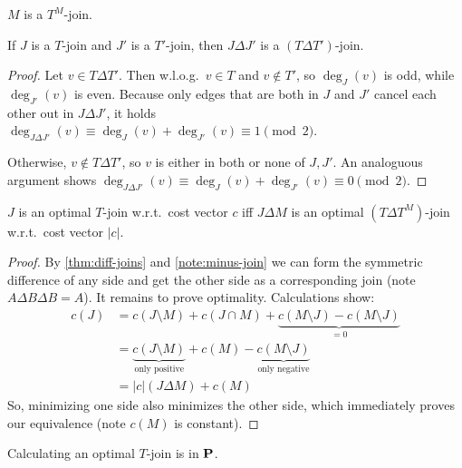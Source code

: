 \begin{remark} \label{note:minus-join}
    $M$ is a $T^M$-join.
\end{remark}
\begin{lemma} \label{thm:diff-joins}
    If $J$ is a $T$-join and $J'$ is a $T'$-join, then $J \Delta J'$ is a $(T \Delta T')$-join.
\end{lemma}
\begin{proof}
    Let $v \in T \Delta T'$. Then w.l.o.g.\ $v \in T$ and $v \not \in T'$,
    so $\deg_{J}(v)$ is odd, while $\deg_{J'}(v)$ is even. Because only edges that are both in $J$ and $J'$
    cancel each other out in $J \Delta J'$, it holds $\deg_{J\Delta J'}(v) \equiv \deg_{J}(v) + \deg_{J'}(v) \equiv 1 \pmod{2}$.

    Otherwise, $v \not \in T \Delta T'$, so $v$ is either in both or none of $J, J'$.
    An analoguous argument shows $\deg_{J\Delta J'}(v) \equiv \deg_{J}(v) + \deg_{J'}(v) \equiv 0 \pmod{2}$.
\end{proof}
\begin{theorem}
    $J$ is an optimal $T$-join w.r.t.\ cost vector $c$
    iff $J \Delta M$ is an optimal $(T \Delta T^M)$-join w.r.t.\ cost vector $|c|$.
\end{theorem}
\begin{proof}
    By \autoref{thm:diff-joins} and \autoref{note:minus-join} we can form the symmetric difference of
    any side and get the other side as a corresponding join (note $A \Delta B \Delta B = A$).
    It remains to prove optimality. Calculations show:
    \begin{align*}
        c(J) & = c(J \setminus M) + c(J \cap M) + \underbrace{c(M\setminus J) - c(M\setminus J)}_{=0}                               \\
             & = \underbrace{c(J \setminus M)}_{\text{only positive}} + c(M) - \underbrace{c(M \setminus J)}_{\text{only negative}} \\
             & = |c|(J \Delta M) + c(M)
    \end{align*}
    So, minimizing one side also minimizes the other side, which immediately proves our equivalence (note $c(M)$ is constant).
\end{proof}
\begin{corollary}
    Calculating an optimal $T$-join is in $\mathbf{P}$.
\end{corollary}
